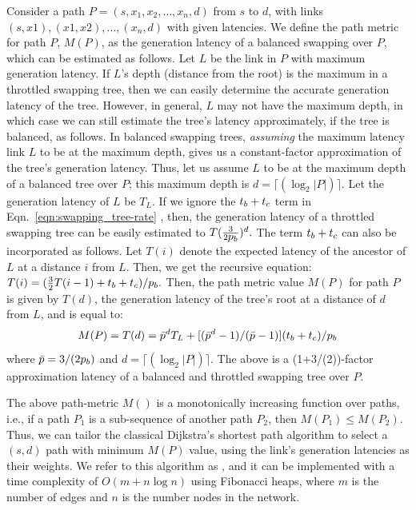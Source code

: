 Consider a path $P = (s, x_1, x_2, \ldots, x_n, d)$ from $s$ to $d$,
with links $(s,x1), (x1, x2), \ldots, (x_n, d)$ with given \eps latencies.
We define the path metric for path $P$, $M(P)$, as the 
\eps generation latency of a balanced swapping over $P$, 
which can be estimated as follows.
Let $L$ be the link in $P$ with maximum generation latency. 
If $L$'s depth (distance from the root) is the maximum in a throttled 
swapping tree, then we can easily determine the accurate generation 
latency of the tree. However, in general, $L$ may not have 
the maximum depth, in which case we can still estimate the tree's latency 
approximately, if the tree is balanced, as follows.
In balanced swapping trees, \textit{assuming} the maximum latency link $L$
to be at the maximum depth, gives us a constant-factor approximation 
of the tree's generation latency. Thus, let us assume $L$ to be at 
the maximum depth of a balanced tree over $P$; this maximum depth
is $d = \lceil(\log_2 |P|)\rceil$.
Let the generation latency of $L$ be $T_L$.
If we ignore the $\mbox{$t_{b}$} + \mbox{$t_c$}$ term in
Eqn.~\ref{eqn:swapping_tree-rate}
, then, the generation latency of a throttled swapping tree can be 
easily estimated to $T (\frac{3}{2\mbox{$p_{b}$}})^d.$ 
The term $\mbox{$t_{b}$} + \mbox{$t_c$}$  can also be incorporated as follows. 
Let $T(i)$ denote the expected latency of the ancestor of $L$ 
at a distance $i$ from $L$. Then, we get the recursive equation:
$T(i) = (\frac{3}{2}T(i-1) + \mbox{$t_{b}$} + \mbox{$t_c$}) / \mbox{$p_{b}$}.$
Then, the path metric value $M(P)$ for path $P$ is given by 
$T(d)$, the generation latency of the tree's root at a distance
of $d$ from $L$, and is equal to: 
$$M(P) = T(d) =\bar{p}^{d}T_L + [(\bar{p}^{d}-1) / (\bar{p}-1)](\mbox{$t_{b}$} + \mbox{$t_c$})/\mbox{$p_{b}$}$$ where 
$\bar{p} = 3/(2\mbox{$p_{b}$})$ and $d = \lceil(\log_2 |P|)\rceil$.
The above is a (1+3/(2\bp))-factor approximation latency 
of a balanced and throttled swapping tree over $P$.

The above path-metric $M()$ is a monotonically increasing function over 
paths, i.e., if a path $P_1$ is a sub-sequence of another path $P_2$, 
then $M(P_1) \leq M(P_2)$. Thus, we can tailor the classical Dijkstra's shortest path
algorithm to select a $(s,d)$ path with minimum $M(P)$ value, 
using the link's \eps generation
latencies as their weights. We refer to this algorithm
as \dpalt, and it can be implemented with a time complexity of 
$O(m + n \log n)$ using Fibonacci heaps, where $m$ is the number of edges 
and $n$ is the number nodes in the network. 

